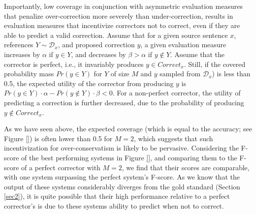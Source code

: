 \documentclass[letter,11pt]{article}
\begin{document}
Importantly, low coverage in conjunction with asymmetric evaluation measures that penalize over-correction
more severely than under-correction, results in evaluation measures that incentivize correctors not to correct,
even if they are able to predict a valid correction. 
Assume that for a given source sentence $x$, references $Y \sim \mathcal{D}_x$, and proposed correction $y$,
a given evaluation measure increases by $\alpha$ if $y \in Y$, and decreases by $\beta > \alpha$ if $y \notin Y$.
Assume that the corrector is perfect, i.e., it invariably produces $y \in Correct_x$.
Still, if the covered probability mass $Pr(y \in Y)$ for $Y$ of size $M$ and $y$ sampled from $\mathcal{D}_x$)
is less than 0.5, the expected utility of the corrector from producing $y$ is $Pr(y \in Y) \cdot \alpha - Pr(y \notin Y) \cdot \beta < 0$.
For a non-perfect corrector, the utility of predicting a correction is further decreased, due to the probability
of producing $y \notin Correct_x$.

As we have seen above, the expected coverage (which is equal to the accuracy; see Figure \ref{}) is often lower
than 0.5 for $M=2$, which suggests that such incentivization for over-conservatism is likely to be pervasive.
Considering the F-score of the best performing systems in Figure \ref{}, and comparing them to the F-score
of a perfect corrector with $M=2$, we find that their scores are comparable, with one system surpassing
the perfect system's F-score.
As we know that the output of these systems considerably diverges from the gold standard (Section \ref{sec2}),
it is quite possible that their high performance relative to a perfect corrector's is due to these systems
ability to predict when not to correct.




\end{document}
